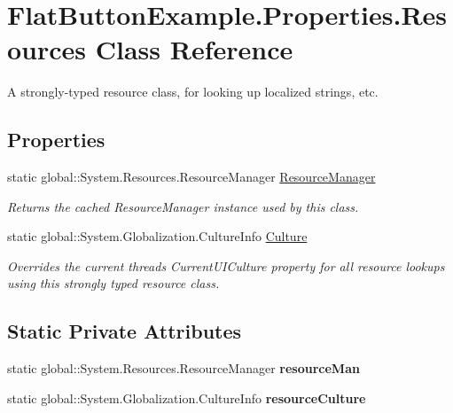 \hypertarget{class_flat_button_example_1_1_properties_1_1_resources}{}\section{Flat\+Button\+Example.\+Properties.\+Resources Class Reference}
\label{class_flat_button_example_1_1_properties_1_1_resources}


A strongly-\/typed resource class, for looking up localized strings, etc.  


\subsection*{Properties}
\begin{DoxyCompactItemize}
\item 
static global\+::\+System.\+Resources.\+Resource\+Manager \mbox{\hyperlink{class_flat_button_example_1_1_properties_1_1_resources_a45fd91f5175b258569cf29b2587e0663}{Resource\+Manager}}
\begin{DoxyCompactList}\small\item\em Returns the cached Resource\+Manager instance used by this class. \end{DoxyCompactList}\item 
static global\+::\+System.\+Globalization.\+Culture\+Info \mbox{\hyperlink{class_flat_button_example_1_1_properties_1_1_resources_a32beafa8d558f7938ce6714586e65a58}{Culture}}
\begin{DoxyCompactList}\small\item\em Overrides the current thread\textquotesingle{}s Current\+U\+I\+Culture property for all resource lookups using this strongly typed resource class. \end{DoxyCompactList}\end{DoxyCompactItemize}
\subsection*{Static Private Attributes}
\begin{DoxyCompactItemize}
\item 
\mbox{\label{class_flat_button_example_1_1_properties_1_1_resources_a51080250da4bd76c2722a8f5b702d33a}} 
static global\+::\+System.\+Resources.\+Resource\+Manager {\bfseries resource\+Man}
\item 
\mbox{\label{class_flat_button_example_1_1_properties_1_1_resources_afb6df971a624077e9bf62794c45eae24}} 
static global\+::\+System.\+Globalization.\+Culture\+Info {\bfseries resource\+Culture}
\end{DoxyCompactItemize}



